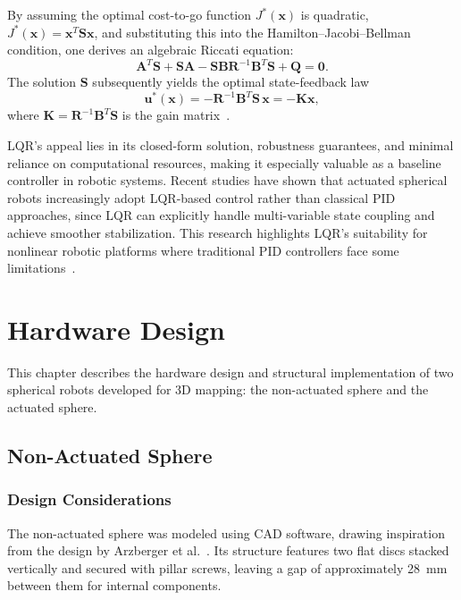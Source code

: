 \documentclass[english, bachelor, utf8]{base/thesis_telematics}
\begin{document}
By assuming the optimal cost-to-go function \(J^*(\mathbf{x})\) is quadratic, \(J^*(\mathbf{x}) = \mathbf{x}^T \mathbf{S} \mathbf{x}\), and substituting this into the Hamilton–Jacobi–Bellman condition, one derives an algebraic Riccati equation:
\[
\mathbf{A}^T \mathbf{S} + \mathbf{S} \mathbf{A} - \mathbf{S} \mathbf{B} \mathbf{R}^{-1} \mathbf{B}^T \mathbf{S} + \mathbf{Q} = \mathbf{0}.
\]
The solution \(\mathbf{S}\) subsequently yields the optimal state-feedback law
\[
\mathbf{u}^*(\mathbf{x}) = -\mathbf{R}^{-1} \mathbf{B}^T \mathbf{S} \, \mathbf{x} = -\mathbf{K} \mathbf{x},
\]
where \(\mathbf{K} = \mathbf{R}^{-1} \mathbf{B}^T \mathbf{S}\) is the gain matrix~\cite{underactuatedLQR}.

LQR's appeal lies in its closed-form solution, robustness guarantees, and minimal reliance on computational resources, making it especially valuable as a baseline controller in robotic systems. Recent studies have shown that actuated spherical robots increasingly adopt LQR-based control rather than classical PID approaches, since LQR can explicitly handle multi-variable state coupling and achieve smoother stabilization. This research highlights LQR’s suitability for nonlinear robotic platforms where traditional PID controllers face some limitations~\cite{novelsphere}.



\chapter{Hardware Design}
\label{ch:hardwaredesign}

This chapter describes the hardware design and structural implementation of two spherical robots developed for 3D mapping: the non-actuated sphere and the actuated sphere.

\section{Non-Actuated Sphere}
\subsection{Design Considerations}

The non-actuated sphere was modeled using CAD software, drawing inspiration from the design by Arzberger et al.~\cite{Kalman_filter_sphere}.
Its structure features two flat discs stacked vertically and secured with pillar screws, leaving a gap of approximately \SI{28}{\milli\meter} between them for internal components. 
\end{document}
